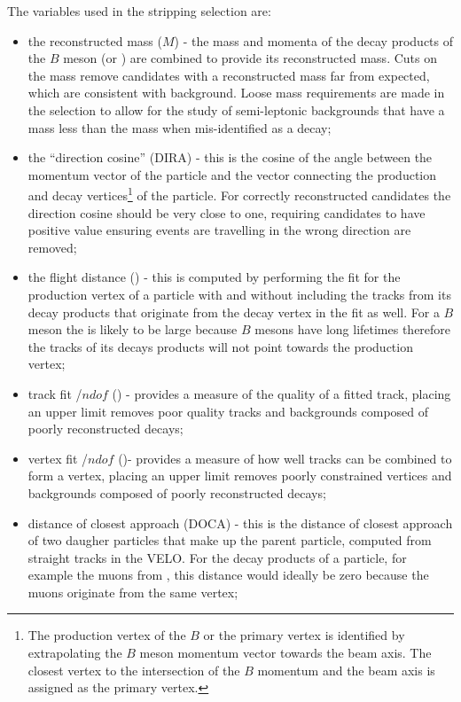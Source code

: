 The variables used in the stripping selection are:
\begin{itemize}
\item the reconstructed mass ($M$) - the mass and momenta of the decay products of the $B$ meson (or \jpsi) are combined to provide its reconstructed mass. Cuts on the mass remove candidates with a reconstructed mass far from expected, which are consistent with background. Loose mass requirements are made in the \bmumu selection to allow for the study of semi-leptonic backgrounds that have a mass less than the \bsd mass when mis-identified as a \bmumu decay;
\item the ``direction cosine'' (DIRA) - this is the cosine of the angle between the momentum vector of the particle and the vector connecting the production and decay vertices\footnote{The production vertex of the $B$ or the primary vertex is identified by extrapolating the $B$ meson momentum vector towards the beam axis. The closest vertex to the intersection of the $B$ momentum and the beam axis is assigned as the primary vertex.} of the particle. For correctly reconstructed candidates the direction cosine should be very close to one, requiring candidates to have positive value ensuring events are travelling in the wrong direction are removed;
\item the flight distance (\chiFD) - this is computed by performing the fit for the production vertex of a particle with and without including the tracks from its decay products that originate from the decay vertex in the fit as well. For a $B$ meson the \chiFD is likely to be large because $B$ mesons have long lifetimes therefore the tracks of its decays products will not point towards the production vertex;
\item track fit \chisqd/$ndof$ (\chitrk) - provides a measure of the quality of a fitted track, placing an upper limit removes poor quality tracks and backgrounds composed of poorly reconstructed decays;
\item vertex fit \chisqd/$ndof$ (\chivtx)- provides a measure of how well tracks can be combined to form a vertex, placing an upper limit removes poorly constrained vertices and backgrounds composed of poorly reconstructed decays;
\item distance of closest approach (DOCA) - this is the distance of closest approach of two daugher particles that make up the parent particle, computed from straight tracks in the VELO. For the decay products of a particle, for example the muons from \bmumu, this distance would ideally be zero because the muons originate from the same vertex;

\end{itemize}
